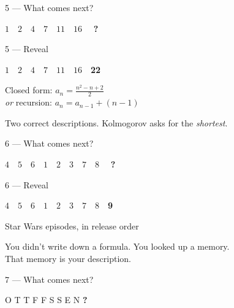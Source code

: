 \documentclass[aspectratio=169, 12pt, xcolor={dvipsnames}]{beamer}
\newcommand{\seq}[1]{{\huge\ttfamily #1}}
\newcommand{\blank}{\textcolor{accent}{\textbf{?}}}
\newcommand{\ans}[1]{\textcolor{accent}{\textbf{#1}}}
\newcommand{\hintline}[1]{\vfill\begin{center}\small\textcolor{hint}{#1}\end{center}}
\begin{document}
\begin{frame}{5 --- What comes next?}
\vfill
\begin{center}\seq{$1 \quad 2 \quad 4 \quad 7 \quad 11 \quad 16 \quad$ \blank}\end{center}
\vfill
\end{frame}

\begin{frame}{5 --- Reveal}
\vfill
\begin{center}\seq{$1 \quad 2 \quad 4 \quad 7 \quad 11 \quad 16 \quad $\ans{22}}\end{center}
\vfill
\begin{center}
\Large Closed form: $a_n = \tfrac{n^2 - n + 2}{2}$\\[0.4em]
\emph{or} recursion: $a_n = a_{n-1} + (n-1)$
\end{center}
\hintline{Two correct descriptions. Kolmogorov asks for the \emph{shortest}.}
\end{frame}

\begin{frame}{6 --- What comes next?}
\vfill
\begin{center}\seq{$4 \quad 5 \quad 6 \quad 1 \quad 2 \quad 3 \quad 7 \quad 8 \quad$ \blank}\end{center}
\vfill
\end{frame}

\begin{frame}{6 --- Reveal}
\vfill
\begin{center}\seq{$4 \quad 5 \quad 6 \quad 1 \quad 2 \quad 3 \quad 7 \quad 8 \quad $\ans{9}}\end{center}
\vfill
\begin{center}\Large Star Wars episodes, in release order\end{center}
\hintline{You didn't write down a formula. You looked up a memory.\\That memory is your description.}
\end{frame}

\begin{frame}{7 --- What comes next?}
\vfill
\begin{center}\seq{O \quad T \quad T \quad F \quad F \quad S \quad S \quad E \quad N \quad \blank}\end{center}
\vfill
\end{frame}
\end{document}
